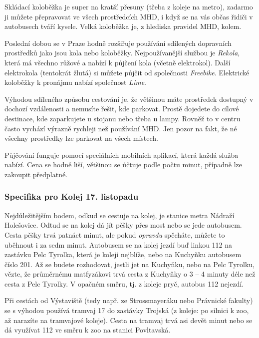 Skládací koloběžka je super na kratší přesuny (třeba z koleje na metro), zadarmo
ji můžete přepravovat ve všech prostředcích MHD, i když se na vás občas řidiči v
autobusech tváří kysele. Velká koloběžka je, z hlediska pravidel MHD, kolem.

Poslední dobou se v Praze hodně rozšiřuje používání sdílených dopravních prostředků jako jsou kola nebo koloběžky. Nejpoužívanější službou je \textit{Rekola}, která má všechno růžové a nabízí k půjčení kola (včetně elektrokol). Další elektrokola (tentokrát žlutá) si můžete půjčit od společnosti \textit{Freebike}. Elektrické koloběžky k pronájmu nabízí společnost \textit{Lime}.


Výhodou sdíleného způsobu cestování je, že většinou máte prostředek dostupný v dochozí vzdálenosti a nemusíte řešit, kde parkovat. Prostě dojedete do cílové destinace, kde zaparkujete u stojanu nebo třeba u lampy. Rovněž to v centru často vychází výrazně rychleji než používání MHD. Jen pozor na fakt, že né všechny prostředky lze parkovat na všech místech.


Půjčování funguje pomocí speciálních mobilních aplikací, která každá služba nabízí. Cena se hodně liší, většinou se účtuje podle počtu minut, případně lze zakoupit předplatné.


\subsubsection{Specifika pro Kolej 17. listopadu}
Nejdůležitějším bodem, odkud se cestuje na kolej, je stanice metra Nádraží
Holešovice. Odtud se na kolej dá jít pěšky přes most nebo se jede autobusem.
Cesta pěšky trvá patnáct minut, ale pokud \textit{opravdu} spěcháte, můžete to
uběhnout i za sedm minut. Autobusem se na kolej jezdí buď linkou 112 na zastávku
Pelc Tyrolka, která je koleji nejblíže, nebo na Kuchyňku autobusem číslo 201. Až
se budete rozhodovat, jestli jet na Kuchyňku, nebo na Pelc Tyrolku, vězte, že
průměrnému matfyzákovi trvá cesta z Kuchyňky o 3 – 4 minuty déle než cesta z
Pelc Tyrolky. V opačném směru, tj. z koleje pryč, autobus 112 nejezdí.

Při cestách od Výstaviště (tedy např. ze Strossmayeráku nebo Právnické fakulty)
se s výhodou používá tramvaj 17 do zastávky Trojská (z koleje: po silnici k zoo,
až narazíte na tramvajové koleje). Cesta na tramvaj trvá asi devět minut nebo se
dá využívat 112 ve směru k zoo na stanici Povltavská.

